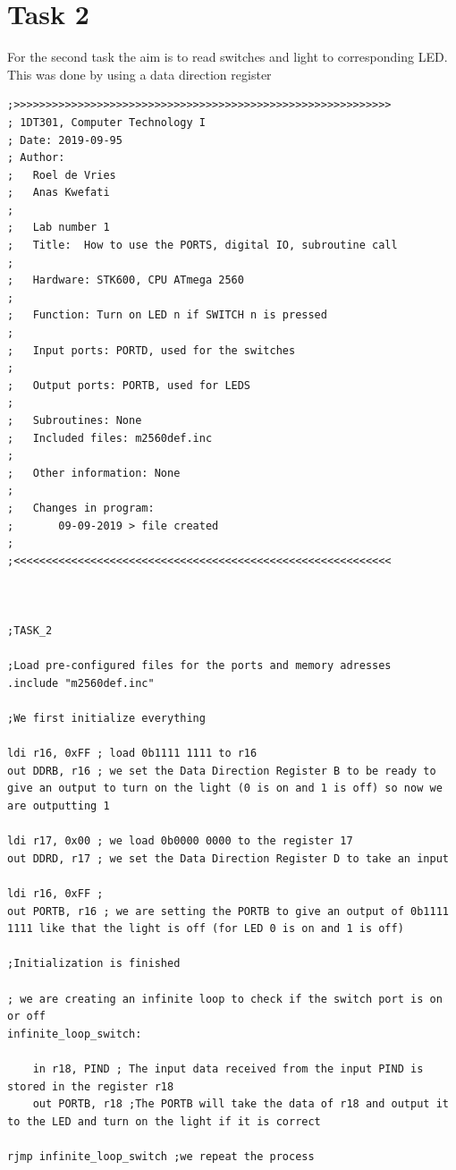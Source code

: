 \documentclass[a4paper,12pt]{article}
\begin{document}
\section{Task 2}
For the second task the aim is to read switches and light to corresponding LED. This was done by using a data direction register 
\lstset{style=Asm}

\begin{lstlisting}
;>>>>>>>>>>>>>>>>>>>>>>>>>>>>>>>>>>>>>>>>>>>>>>>>>>>>>>>>>>>
; 1DT301, Computer Technology I
; Date: 2019-09-95
; Author:
;   Roel de Vries
;   Anas Kwefati
;
;	Lab number 1
;	Title:	How to use the PORTS, digital IO, subroutine call
;
;	Hardware: STK600, CPU ATmega 2560
;
;	Function: Turn on LED n if SWITCH n is pressed
;
;	Input ports: PORTD, used for the switches
;
;	Output ports: PORTB, used for LEDS
;
;	Subroutines: None
;	Included files: m2560def.inc
;
;	Other information: None
;
;	Changes in program:
;		09-09-2019 > file created
;
;<<<<<<<<<<<<<<<<<<<<<<<<<<<<<<<<<<<<<<<<<<<<<<<<<<<<<<<<<<<



;TASK_2

;Load pre-configured files for the ports and memory adresses
.include "m2560def.inc"

;We first initialize everything 

ldi r16, 0xFF ; load 0b1111 1111 to r16
out DDRB, r16 ; we set the Data Direction Register B to be ready to give an output to turn on the light (0 is on and 1 is off) so now we are outputting 1

ldi r17, 0x00 ; we load 0b0000 0000 to the register 17
out DDRD, r17 ; we set the Data Direction Register D to take an input  

ldi r16, 0xFF ; 
out PORTB, r16 ; we are setting the PORTB to give an output of 0b1111 1111 like that the light is off (for LED 0 is on and 1 is off) 

;Initialization is finished

; we are creating an infinite loop to check if the switch port is on or off
infinite_loop_switch:

	in r18, PIND ; The input data received from the input PIND is stored in the register r18
	out PORTB, r18 ;The PORTB will take the data of r18 and output it to the LED and turn on the light if it is correct 

rjmp infinite_loop_switch ;we repeat the process


\end{lstlisting}
\end{document}
